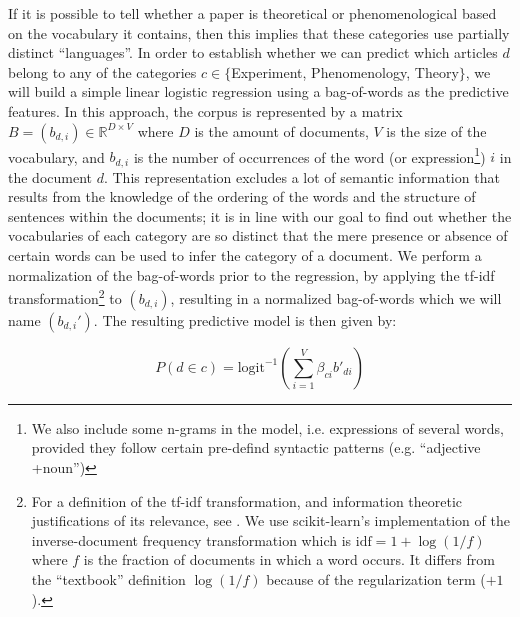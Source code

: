 \documentclass[smallextended]{svjour3}
\begin{document}
If it is possible to tell whether a paper is theoretical or phenomenological based on the vocabulary it contains, then this implies that these categories use partially distinct ``languages''. In order to establish whether we can predict which articles $d$ belong to any of the categories $c \in \{$Experiment, Phenomenology, Theory$\}$, we will build a simple linear logistic regression using a bag-of-words as the predictive features. In this approach, the corpus is represented by a matrix $B=(b_{d,i}) \in \mathbb{R}^{D\times V}$ where $D$ is the amount of documents, $V$ is the size of the vocabulary, and $b_{d,i}$ is the number of occurrences of the word (or expression\footnote{We also include some n-grams in the model, i.e. expressions of several words, provided they follow certain pre-defind syntactic patterns (e.g. ``adjective +noun'')}) $i$ in the document $d$. This representation excludes a lot of semantic information that results from the knowledge of the ordering of the words and the structure of sentences within the documents; it is in line with our goal to find out whether the vocabularies of each category are so distinct that the mere presence or absence of certain words can be used to infer the category of a document. We perform a normalization of the bag-of-words prior to the regression, by applying the tf-idf transformation\footnote{For a definition of the tf-idf transformation, and information theoretic justifications of its relevance, see \citealt{Beel2015_tfidf_uses,Robertson2004_tfidf_justification}. We use scikit-learn's implementation of the inverse-document frequency transformation which is $\text{idf} = 1+\log(1/f)$ where $f$ is the fraction of documents in which a word occurs. It differs from the ``textbook'' definition $\log(1/f)$ because of the regularization term ($+1$).} to $(b_{d,i})$, resulting in a normalized bag-of-words which we will name $(b_{d,i}')$. The resulting predictive model is then given by:

\begin{equation}
    \label{eq:logistic_bow_classifier}
    P(d\in c) = \mathrm{logit}^{-1}\left(\sum_{i=1}^V \beta_{ci} b'_{di}  \right)
\end{equation}
\end{document}
